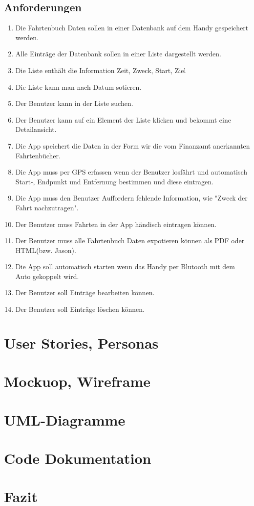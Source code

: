 \documentclass{article}
\begin{document}
\subsection{Anforderungen}
	\begin{enumerate}
	\item Die Fahrtenbuch Daten sollen in einer Datenbank auf dem Handy gespeichert werden.
	\item Alle Einträge der Datenbank sollen in einer Liste dargestellt werden.
	\item Die Liste enthält die Information Zeit, Zweck, Start, Ziel
	\item Die Liste kann man nach Datum sotieren.
	\item Der Benutzer kann in der Liste suchen.
	\item Der Benutzer kann auf ein Element der Liste klicken und bekommt eine Detailansicht.
	\item Die App speichert die Daten in der Form wir die vom Finanzamt anerkannten Fahrtenbücher.
	\item Die App muss per GPS erfassen wenn der Benutzer losfährt und automatisch Start-, Endpunkt und Entfernung bestimmen und diese eintragen.
	\item Die App muss den Benutzer Auffordern fehlende Information, wie "Zweck der Fahrt nachzutragen".
	\item Der Benutzer muss Fahrten in der App händisch eintragen können.
	\item Der Benutzer muss alle Fahrtenbuch Daten expotieren können als PDF oder HTML(bzw. Jason).
	\item Die App soll automatisch starten wenn das Handy per Blutooth mit dem Auto gekoppelt wird.
	\item Der Benutzer soll Einträge bearbeiten können.
	\item Der Benutzer soll Einträge löschen können.
	\end{enumerate}

\section{User Stories, Personas}

\section{Mockuop, Wireframe}

\section{UML-Diagramme}

\section{Code Dokumentation}

\section{Fazit}
\end{document}
